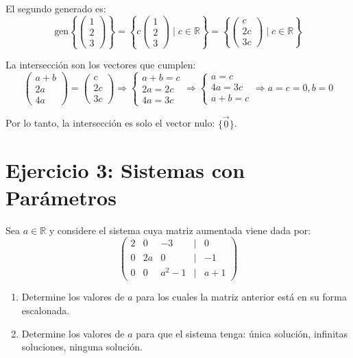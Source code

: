 \documentclass[11pt]{article}
\begin{document}
\begin{tcolorbox}[colback=green1!10, colframe=green1, title=Solución]
El segundo generado es:
\[
\text{gen}\left\{\begin{pmatrix}1\\2\\3\end{pmatrix}\right\} = \left\{c\begin{pmatrix}1\\2\\3\end{pmatrix} \mid c\in\mathbb{R}\right\}
= \left\{\begin{pmatrix}c\\2c\\3c\end{pmatrix} \mid c\in\mathbb{R}\right\}
\]

La intersección son los vectores que cumplen:
\[
\begin{pmatrix}a+b\\2a\\4a\end{pmatrix} = \begin{pmatrix}c\\2c\\3c\end{pmatrix}
\Rightarrow
\begin{cases}
a + b = c \\
2a = 2c \\
4a = 3c
\end{cases}
\Rightarrow
\begin{cases}
a = c \\
4a = 3c \\
a + b = c
\end{cases}
\Rightarrow a = c = 0, b = 0
\]

Por lo tanto, la intersección es solo el vector nulo: $\{\vec{0}\}$.
\end{tcolorbox}

\section*{Ejercicio 3: Sistemas con Parámetros}

\begin{tcolorbox}[colback=blue1!10, colframe=blue1, title=Enunciado]
Sea $a \in \mathbb{R}$ y considere el sistema cuya matriz aumentada viene dada por:
\[
\begin{pmatrix}
2 & 0 & -3 & | & 0 \\
0 & 2a & 0 & | & -1 \\
0 & 0 & a^2 - 1 & | & a + 1
\end{pmatrix}
\]

\begin{enumerate}[label=\alph*)]
    \item Determine los valores de $a$ para los cuales la matriz anterior está en su forma escalonada.
    \item Determine los valores de $a$ para que el sistema tenga: única solución, infinitas soluciones, ninguna solución.
\end{enumerate}
\end{tcolorbox}
\end{document}
